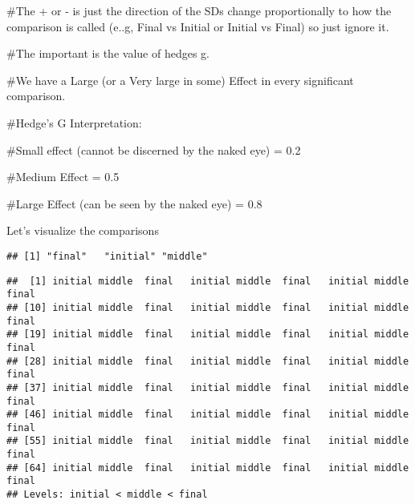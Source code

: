 \documentclass[
]{article}
\newenvironment{Shaded}{\begin{snugshade}}{\end{snugshade}}
\newcommand{\DataTypeTok}[1]{\textcolor[rgb]{0.13,0.29,0.53}{#1}}
\newcommand{\KeywordTok}[1]{\textcolor[rgb]{0.13,0.29,0.53}{\textbf{#1}}}
\newcommand{\NormalTok}[1]{#1}
\newcommand{\OperatorTok}[1]{\textcolor[rgb]{0.81,0.36,0.00}{\textbf{#1}}}
\newcommand{\StringTok}[1]{\textcolor[rgb]{0.31,0.60,0.02}{#1}}
\begin{document}
\#The + or - is just the direction of the SDs change proportionally to
how the comparison is called (e..g, Final vs Initial or Initial vs
Final) so just ignore it.

\#The important is the value of hedges g.

\#We have a Large (or a Very large in some) Effect in every significant
comparison.

\#Hedge's G Interpretation:

\#Small effect (cannot be discerned by the naked eye) = 0.2

\#Medium Effect = 0.5

\#Large Effect (can be seen by the naked eye) = 0.8

Let's visualize the comparisons

\begin{Shaded}
\end{Shaded}

\begin{verbatim}
## [1] "final"   "initial" "middle"
\end{verbatim}

\begin{Shaded}
\end{Shaded}

\begin{verbatim}
##  [1] initial middle  final   initial middle  final   initial middle  final  
## [10] initial middle  final   initial middle  final   initial middle  final  
## [19] initial middle  final   initial middle  final   initial middle  final  
## [28] initial middle  final   initial middle  final   initial middle  final  
## [37] initial middle  final   initial middle  final   initial middle  final  
## [46] initial middle  final   initial middle  final   initial middle  final  
## [55] initial middle  final   initial middle  final   initial middle  final  
## [64] initial middle  final   initial middle  final   initial middle  final  
## Levels: initial < middle < final
\end{verbatim}
\end{document}
